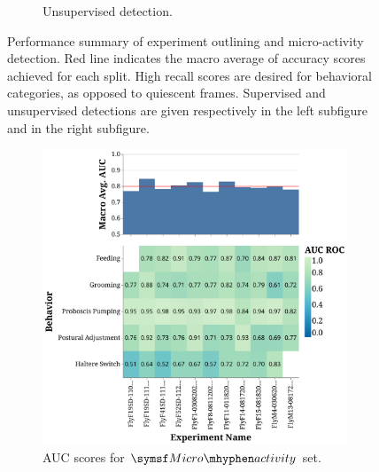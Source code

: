 \begin{figure}[t]
\begin{subfigure}[b]{0.495\linewidth}
		\caption{Unsupervised detection.}
	\end{subfigure}%
	\caption[Performance summary of experiment outlining and micro-activity detection.]{Performance summary of experiment outlining and micro-activity detection.
		Red line indicates the macro average of accuracy scores achieved for each split.
		High recall scores are desired for behavioral categories, as opposed to quiescent frames.
		Supervised and unsupervised detections are given respectively in the left subfigure and in the right subfigure.}
\end{figure}

\begin{figure}[htb!]
	\centering
	\begin{subfigure}[ht!]{0.495\linewidth}
		\centering\includegraphics[width=\linewidth]{figures/AUC_ROC-DActfiltered.pdf}
		\caption{AUC scores for $\MicroActivity$ set. \label{figure:AUC-ROC-Act}}
	\end{subfigure}%
	\hfill
	\begin{subfigure}[ht!]{0.495\linewidth}

\end{subfigure}
\end{figure}

